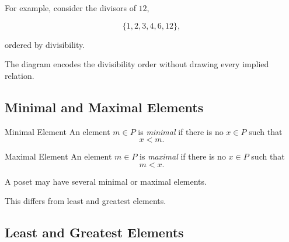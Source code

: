 For example, consider the divisors of \(12\),

\[ \{1,2,3,4,6,12\}, \]

ordered by divisibility.

\begin{center}
\end{center}

The diagram encodes the divisibility order without drawing every implied
relation.

\subsection{Minimal and Maximal Elements}
\label{subsec:minimal-maximal}

\begin{definitionbox}{Minimal Element}
An element \(m\in P\) is \emph{minimal} if there is no \(x\in P\) such that
\[ x<m. \]
\end{definitionbox}

\begin{definitionbox}{Maximal Element}
An element \(m\in P\) is \emph{maximal} if there is no \(x\in P\) such that
\[ m<x. \]
\end{definitionbox}

A poset may have several minimal or maximal elements.

This differs from least and greatest elements.

\subsection{Least and Greatest Elements}
\label{subsec:least-greatest-elements}

